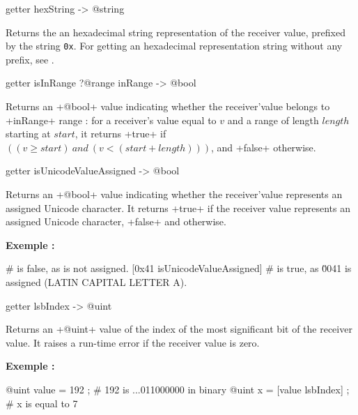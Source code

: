
\begin{galgas}
getter hexString -> @string
\end{galgas}

Returns the an hexadecimal string representation of the receiver value, prefixed by the string \texttt{0x}. For getting an hexadecimal representation string without any prefix, see .




\begin{galgas}
getter isInRange ?@range inRange -> @bool
\end{galgas}

{Returns an \ggs+@bool+ value indicating whether the receiver'value belongs to \ggs+inRange+ range : for a receiver's value equal to $v$ and a range of length $length$ starting at $start$, it returns \ggs+true+ if $((v \geqslant start)~and~(v<(start+length)))$, and \ggs+false+ otherwise.




\begin{galgas}
getter isUnicodeValueAssigned -> @bool
\end{galgas}

Returns an \ggs+@bool+ value indicating whether the receiver'value represents an assigned Unicode character. It returns \ggs+true+ if the receiver value represents an assigned Unicode character, \ggs+false+ and otherwise.

\textbf{Exemple :}
\begin{galgas}
 # is false, as \uFFFF is not assigned.
[0x41 isUnicodeValueAssigned] # is true, as \u0041 is assigned (LATIN CAPITAL LETTER A).
\end{galgas}




\begin{galgas}
getter lsbIndex -> @uint
\end{galgas}

Returns an \ggs+@uint+ value of the index of the most significant bit of the receiver value. It raises a run-time error if the receiver value is zero.

\textbf{Exemple :}
\begin{galgas}
@uint value = 192 ; # 192 is ...011000000 in binary
@uint x = [value lsbIndex] ; # x is equal to 7
\end{galgas}

}
